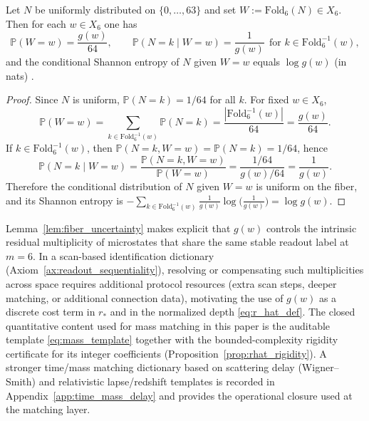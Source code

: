 \begin{lemma}\label{lem:fiber_uncertainty}
Let $N$ be uniformly distributed on $\{0,\dots,63\}$ and set $W:=\mathrm{Fold}_6(N)\in X_6$.
Then for each $w\in X_6$ one has
\[
\mathbb{P}(W=w)=\frac{g(w)}{64},
\qquad
\mathbb{P}(N=k\mid W=w)=\frac{1}{g(w)}\ \ \text{for }k\in \mathrm{Fold}_6^{-1}(w),
\]
and the conditional Shannon entropy of $N$ given $W=w$ equals $\log g(w)$ (in nats) \cite{Shannon1948,CoverThomas2006}.
\end{lemma}
\begin{proof}
Since $N$ is uniform, $\mathbb{P}(N=k)=1/64$ for all $k$.
For fixed $w\in X_6$,
\[
\mathbb{P}(W=w)=\sum_{k\in \mathrm{Fold}_6^{-1}(w)}\mathbb{P}(N=k)=\frac{|\mathrm{Fold}_6^{-1}(w)|}{64}=\frac{g(w)}{64}.
\]
If $k\in \mathrm{Fold}_6^{-1}(w)$, then $\mathbb{P}(N=k,W=w)=\mathbb{P}(N=k)=1/64$, hence
\[
\mathbb{P}(N=k\mid W=w)=\frac{\mathbb{P}(N=k,W=w)}{\mathbb{P}(W=w)}=\frac{1/64}{g(w)/64}=\frac{1}{g(w)}.
\]
Therefore the conditional distribution of $N$ given $W=w$ is uniform on the fiber, and its Shannon entropy is
$-\sum_{k\in \mathrm{Fold}_6^{-1}(w)} \frac{1}{g(w)}\log\!\bigl(\frac{1}{g(w)}\bigr)=\log g(w)$.
\end{proof}

\begin{remark}\label{rem:mass_as_scan_density}
Lemma~\ref{lem:fiber_uncertainty} makes explicit that $g(w)$ controls the intrinsic residual multiplicity of microstates that share the same stable readout label at $m=6$.
In a scan-based identification dictionary (Axiom~\ref{ax:readout_sequentiality}), resolving or compensating such multiplicities across space requires additional protocol resources (extra scan steps, deeper matching, or additional connection data), motivating the use of $g(w)$ as a discrete cost term in $r_\ast$ and in the normalized depth \eqref{eq:r_hat_def}.
The closed quantitative content used for mass matching in this paper is the auditable template \eqref{eq:mass_template} together with the bounded-complexity rigidity certificate for its integer coefficients (Proposition~\ref{prop:rhat_rigidity}).
A stronger time/mass matching dictionary based on scattering delay (Wigner--Smith) and relativistic lapse/redshift templates is recorded in Appendix~\ref{app:time_mass_delay} and provides the operational closure used at the matching layer.
\end{remark}

